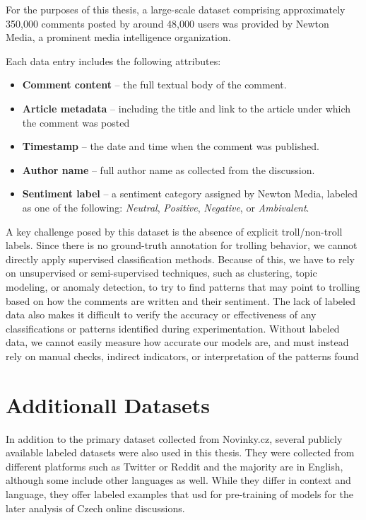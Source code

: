 \documentclass[twoside]{ctuthesis}
\theoremstyle{plain}
\theoremstyle{definition}
\theoremstyle{note}
\begin{document}
For the purposes of this thesis, a large-scale dataset comprising approximately 350,000 comments posted by around 48,000 users was provided by Newton Media, a prominent media intelligence organization.\par 

Each data entry includes the following attributes:
\begin{itemize}
    \item \textbf{Comment content} – the full textual body of the comment.
    
    \item \textbf{Article metadata} – including the title and link to the article under which the comment was posted
    
    \item \textbf{Timestamp} – the date and time when the comment was published.
    
    \item \textbf{Author name} – full author name as collected from the discussion.
    
    \item \textbf{Sentiment label} – a sentiment category assigned by Newton Media, labeled as one of the following: \textit{Neutral}, \textit{Positive}, \textit{Negative}, or \textit{Ambivalent}.
\end{itemize}

A key challenge posed by this dataset is the absence of explicit troll/non-troll labels. Since there is no ground-truth annotation for trolling behavior,  we cannot directly apply supervised classification methods. Because of this, we have to rely on unsupervised or semi-supervised techniques, such as clustering, topic modeling, or anomaly detection, to try to find patterns that may point to trolling based on how the comments are written and their sentiment. The lack of labeled data also makes it difficult to verify the accuracy or effectiveness of any classifications or patterns identified during experimentation. Without labeled data, we cannot easily measure how accurate our models are, and must instead rely on manual checks, indirect indicators, or interpretation of the patterns found\par

\section{Additionall Datasets}

In addition to the primary dataset collected from Novinky.cz, several publicly available labeled datasets were also used in this thesis. They were collected from different platforms such as Twitter or Reddit and the majority are in English, although some include other languages as well. While they differ in context and language, they offer labeled examples that usd for pre-training of models for the later analysis of Czech online discussions.\par
\end{document}
